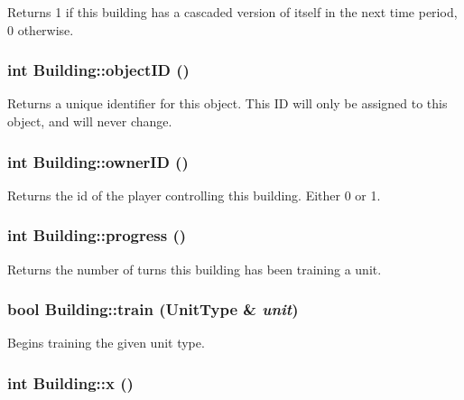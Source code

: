 Returns 1 if this building has a cascaded version of itself in the next time period, 0 otherwise. \hypertarget{classBuilding_715ec055ad32b0e8efab7028ef621269}{
\subsubsection[{objectID}]{\setlength{\rightskip}{0pt plus 5cm}int Building::objectID ()}}
\label{classBuilding_715ec055ad32b0e8efab7028ef621269}


Returns a unique identifier for this object. This ID will only be assigned to this object, and will never change. \hypertarget{classBuilding_bc8274e573fc95b0ba1c868ad4d61936}{
\subsubsection[{ownerID}]{\setlength{\rightskip}{0pt plus 5cm}int Building::ownerID ()}}
\label{classBuilding_bc8274e573fc95b0ba1c868ad4d61936}


Returns the id of the player controlling this building. Either 0 or 1. \hypertarget{classBuilding_f02667e8eb45206cec80b2018be37932}{
\subsubsection[{progress}]{\setlength{\rightskip}{0pt plus 5cm}int Building::progress ()}}
\label{classBuilding_f02667e8eb45206cec80b2018be37932}


Returns the number of turns this building has been training a unit. \hypertarget{classBuilding_95df4b71278ab7de3b4d6d631ef4d01c}{
\subsubsection[{train}]{\setlength{\rightskip}{0pt plus 5cm}bool Building::train ({\bf UnitType} \& {\em unit})}}
\label{classBuilding_95df4b71278ab7de3b4d6d631ef4d01c}


Begins training the given unit type. \hypertarget{classBuilding_2709a75a9687a437d2c18b0118cc1e84}{
\subsubsection[{x}]{\setlength{\rightskip}{0pt plus 5cm}int Building::x ()}}
\label{classBuilding_2709a75a9687a437d2c18b0118cc1e84}


